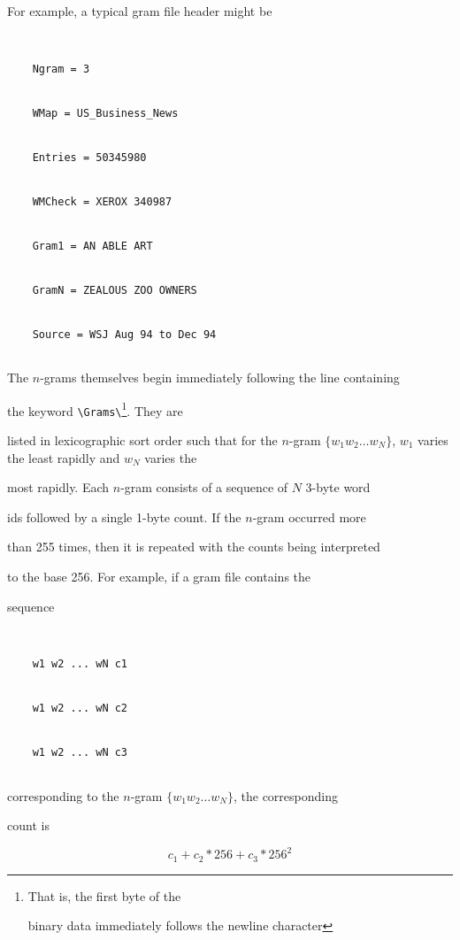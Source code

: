 For example, a typical gram file header might be


\begin{verbatim}


    Ngram = 3


    WMap = US_Business_News


    Entries = 50345980


    WMCheck = XEROX 340987


    Gram1 = AN ABLE ART


    GramN = ZEALOUS ZOO OWNERS


    Source = WSJ Aug 94 to Dec 94


\end{verbatim}





The $n$-grams themselves begin immediately following the line containing


the keyword \verb+\Grams\+\footnote{That is, the first byte of the


binary data immediately follows the newline character}.  They are


listed in lexicographic sort order such that for the $n$-gram $\{w_1 w_2


\ldots w_N\}$, $w_1$ varies the least rapidly and $w_N$ varies the


most rapidly.  Each $n$-gram consists of a sequence of $N$ 3-byte word


ids followed by a single 1-byte count.  If the $n$-gram occurred more


than 255 times, then it is repeated with the counts being interpreted


to the base 256.  For example, if a gram file contains the


sequence


\begin{verbatim}


    w1 w2 ... wN c1


    w1 w2 ... wN c2


    w1 w2 ... wN c3


\end{verbatim}


corresponding to the $n$-gram $\{w_1 w_2 \ldots w_N\}$, the corresponding


count is


\[


   c_1 + c_2*256 + c_3*256^2


\]





